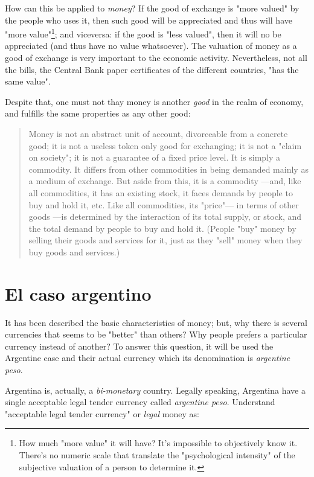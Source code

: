 \documentclass[12pt,a4paper,twoside]{book}
\begin{document}
How can this be applied to \textit{money}? If the good of exchange is "more valued" by the people who uses it, then such good will be appreciated and thus will have "more value"\footnote{How much "more value" it will have? It's impossible to objectively know it. There's no numeric scale that translate the "psychological intensity" of the subjective valuation of a person to determine it.}; and viceversa: if the good is "less valued", then it will no be appreciated (and thus have no value whatsoever). The valuation of money as a good of exchange is very important to the economic activity. Nevertheless, not all the bills, the Central Bank paper certificates of the different countries, "has the same value".

Despite that, one must not thay money is another \textit{good} in the realm of economy, and fulfills the same properties as any other good:

\begin{quotation}
Money is not an abstract unit of account, divorceable from a concrete good; it is not a useless token only good for exchanging; it is not a "claim on society"; it is not a guarantee of a fixed price level. It is simply a commodity. It differs from other commodities in being demanded mainly as a medium of exchange. But aside from this, it is a commodity —and, like all commodities, it has an existing stock, it faces demands by people to buy and hold it, etc. Like all commodities, its "price"— in terms of other goods —is determined by the interaction of its total supply, or stock, and the total demand by people to buy and hold it. (People "buy" money by selling their goods and services for it, just as they "sell" money when they buy goods and services.) \cite[pág. 9-10]{rothbard:money}
\end{quotation}

\chapter{El caso argentino}
It has been described the basic characteristics of money; but, why there is several currencies that seems to be "better" than others? Why people prefers a particular currency instead of another? To answer this question, it will be used the Argentine case and their actual currency which its denomination is \textit{argentine peso}.

Argentina is, actually, a \textit{bi-monetary} country. Legally speaking, Argentina have a single acceptable legal tender currency called \textit{argentine peso}. Understand "acceptable legal tender currency" or \textit{legal} money as:
\end{document}

